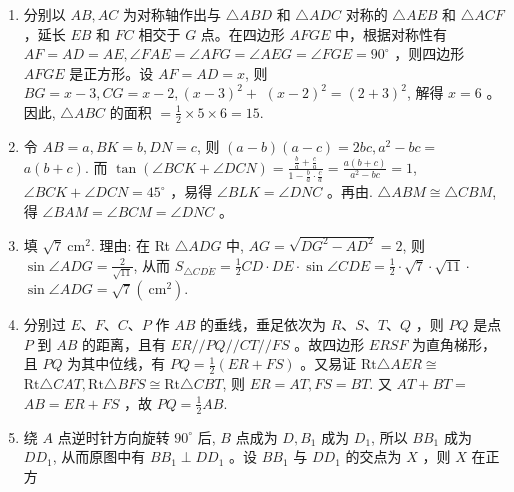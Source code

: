 \documentclass[10pt]{article}
\begin{document}
\begin{enumerate}
  \item 分别以 $A B, A C$ 为对称轴作出与 $\triangle A B D$ 和 $\triangle A D C$ 对称的 $\triangle A E B$ 和 $\triangle A C F$ ，延长 $E B$ 和 $F C$ 相交于 $G$ 点。在四边形 $A F G E$ 中，根据对称性有 $A F=A D=A E, \angle F A E=\angle A F G=\angle A E G=\angle F G E=90^{\circ}$ ，则四边形 $A F G E$ 是正方形。设 $A F=A D=x$, 则 $B G=x-3, C G=x-2,(x-3)^{2}+$ $(x-2)^{2}=(2+3)^{2}$, 解得 $x=6$ 。因此, $\triangle A B C$ 的面积 $=\frac{1}{2} \times 5 \times 6=15$.
  \item 令 $A B=a, B K=b, D N=c$, 则 $(a-b)(a-c)=2 b c, a^{2}-b c=$ $a(b+c)$. 而 $\tan (\angle B C K+\angle D C N)=\frac{\frac{b}{a}+\frac{c}{a}}{1-\frac{b}{a} \cdot \frac{c}{a}}=\frac{a(b+c)}{a^{2}-b c}=1$, $\angle B C K+\angle D C N=45^{\circ}$ ，易得 $\angle B L K=\angle D N C$ 。再由. $\triangle A B M \cong \triangle C B M$,得 $\angle B A M=\angle B C M=\angle D N C$ 。
  \item 填 $\sqrt{7} \mathrm{~cm}^{2}$. 理由: 在 Rt $\triangle A D G$ 中, $A G=\sqrt{D G^{2}-A D^{2}}=2$, 则 $\sin \angle A D G=\frac{2}{\sqrt{11}}$, 从而 $S_{\triangle C D \dot{E}}=\frac{1}{2} C D \cdot D E \cdot \sin \angle C D E=\frac{1}{2} \cdot \sqrt{7} \cdot \sqrt{11} \cdot$ $\sin \angle A D G=\sqrt{7}\left(\mathrm{~cm}^{2}\right)$.
  \item 分别过 $E 、 F 、 C 、 P$ 作 $A B$ 的垂线，垂足依次为 $R 、 S 、 T 、 Q$ ，则 $P Q$ 是点 $P$ 到 $A B$ 的距离，且有 $E R / / P Q / / C T / / F S$ 。故四边形 $E R S F$ 为直角梯形，且 $P Q$ 为其中位线，有 $P Q=\frac{1}{2}(E R+F S)$ 。又易证 $\mathrm{Rt} \triangle A E R \cong$ $\mathrm{Rt} \triangle C A T, \mathrm{Rt} \triangle B F S \cong \mathrm{Rt} \triangle C B T$, 则 $E R=A T, F S=B T$. 又 $A T+B T=$ $A B=E R+F S$ ，故 $P Q=\frac{1}{2} A B$.
  \item 绕 $A$ 点逆时针方向旋转 $90^{\circ}$ 后, $B$ 点成为 $D, B_{1}$ 成为 $D_{1}$, 所以 $B B_{1}$ 成为 $D D_{1}$, 从而原图中有 $B B_{1} \perp D D_{1}$ 。设 $B B_{1}$ 与 $D D_{1}$ 的交点为 $X$ ，则 $X$ 在正方
\end{enumerate}
\end{document}
